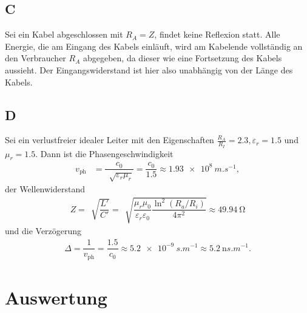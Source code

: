 \documentclass[a4paper,10pt]{article}
\numberwithin{equation}{section}
\begin{document}
\subsection{C}
Sei ein Kabel abgeschlossen mit $R_A=Z$, findet keine Reflexion statt.
Alle Energie, die am Eingang des Kabels einläuft, wird am Kabelende vollständig an den Verbraucher $R_A$ abgegeben, da dieser wie eine Fortsetzung des Kabels aussieht.
Der Eingangswiderstand ist hier also unabhängig von der Länge des Kabels.

\subsection{D}
Sei ein verlustfreier idealer Leiter mit den Eigenschaften $\tfrac{R_A}{R_I}=2.3,\varepsilon _r=1.5$ und $\mu _r=1.5$.
Dann ist die Phasengeschwindigkeit
\begin{align} 
        v_{\text{ph}}&=\dfrac{c_0}{\,\sqrt[]{\varepsilon _r\mu _r}}=\dfrac{c_0}{1.5}\approx \SI{1.93e+8}{m.s ^{-1}}
,\end{align} 
der Wellenwiderstand
\begin{align} 
        Z=\,\sqrt[]{\dfrac{L'}{C'}}=\,\sqrt[]{\dfrac{\mu _r\mu _0}{\varepsilon _r\varepsilon _0}\dfrac{\ln^2\left(R_a/R_i\right)}{4\pi ^2}}\approx \SI{49.94}{\ohm}
\end{align} 
und die Verzögerung
\begin{align} 
        \Delta =\dfrac{1}{v_{\text{ph} }}=\dfrac{1.5}{c_0}\approx \SI{5.2e-9}{s.m ^{-1}}\approx \SI{5.2}{\nano s.m ^{-1}}
.\end{align} 


\newpage
\section{Auswertung}
\end{document}
